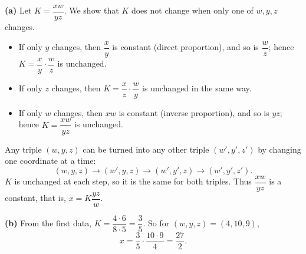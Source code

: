 \textbf{(a)} Let $K=\dfrac{xw}{yz}$. We show that $K$ does not change when only one of $w,y,z$ changes.
\begin{itemize}
\item If only $y$ changes, then $\dfrac {x}{y}$ is constant (direct proportion), and so is $\dfrac {w}{z}$; hence $K=\dfrac {x}{y}\cdot\dfrac {w}{z}$ is unchanged.
\item If only $z$ changes, then $K=\dfrac {x}{z}\cdot\dfrac {w}{y}$ is unchanged in the same way.
\item If only $w$ changes, then $xw$ is constant (inverse proportion), and so is $yz$; hence $K=\dfrac{xw}{yz}$ is unchanged.
\end{itemize}
Any triple $(w,y,z)$ can be turned into any other triple $(w',y',z')$ by changing one coordinate at a time:
\[(w,y,z)\to(w',y,z)\to(w',y',z)\to(w',y',z').\]
$K$ is unchanged at each step, so it is the same for both triples. Thus $\dfrac{xw}{yz}$ is a constant, that is, $x=K\dfrac{yz}{w}$.

\textbf{(b)} From the first data, $K=\dfrac{4\cdot6}{8\cdot5}=\dfrac{3}{5}$. So for $(w,y,z)=(4,10,9)$,
\[x=\dfrac{3}{5}\cdot\dfrac{10\cdot9}{4}=\boxed{\dfrac{27}{2}}.\]
